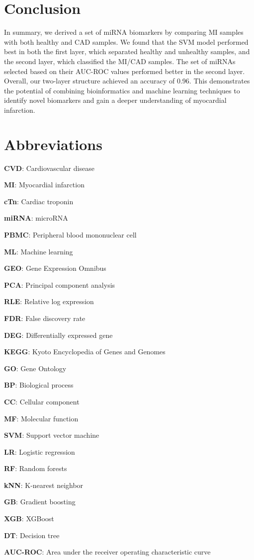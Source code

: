 \documentclass[sn-mathphys,Numbered]{sn-jnl}%
\theoremstyle{thmstyleone}%
\theoremstyle{thmstyletwo}%
\theoremstyle{thmstylethree}%
\begin{document}
\section{Conclusion}\label{conclusion}

In summary, we derived a set of miRNA biomarkers by comparing MI samples
with both healthy and CAD samples. We found that the SVM model performed
best in both the first layer, which separated healthy and unhealthy
samples, and the second layer, which classified the MI/CAD samples. The
set of miRNAs selected based on their AUC-ROC values performed better in
the second layer. Overall, our two-layer structure achieved an accuracy
of 0.96. This demonstrates the potential of combining bioinformatics and
machine learning techniques to identify novel biomarkers and gain a
deeper understanding of myocardial infarction.

\section{Abbreviations}\label{abbreviations}

\begin{description}
  \item \textbf{CVD}: Cardiovascular disease
  \item \textbf{MI}: Myocardial infarction
  \item \textbf{cTn}: Cardiac troponin
  \item \textbf{miRNA}: microRNA 
  \item \textbf{PBMC}: Peripheral blood mononuclear cell 
  \item \textbf{ML}: Machine learning 
  \item \textbf{GEO}: Gene Expression Omnibus 
  \item \textbf{PCA}: Principal component analysis 
  \item \textbf{RLE}: Relative log expression 
  \item \textbf{FDR}: False discovery rate 
  \item \textbf{DEG}: Differentially expressed gene
  \item \textbf{KEGG}: Kyoto Encyclopedia of Genes and Genomes 
  \item \textbf{GO}: Gene Ontology  
  \item \textbf{BP}: Biological process 
  \item \textbf{CC}: Cellular component 
  \item \textbf{MF}: Molecular function 
  \item \textbf{SVM}: Support vector machine 
  \item \textbf{LR}: Logistic regression 
  \item \textbf{RF}: Random forests
  \item \textbf{kNN}: K-nearest neighbor 
  \item \textbf{GB}: Gradient boosting 
  \item \textbf{XGB}: XGBoost 
  \item \textbf{DT}: Decision tree 
  \item \textbf{AUC-ROC}: Area under the receiver operating characteristic curve 
\end{description}
\end{document}
